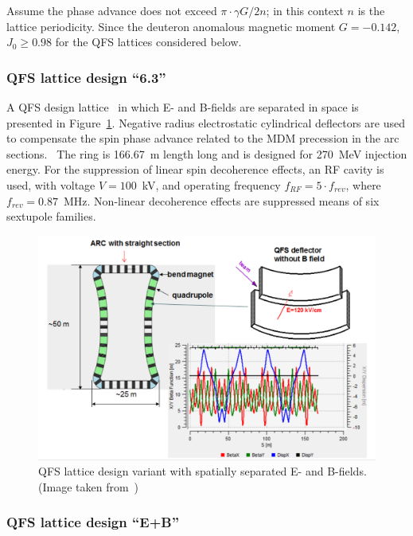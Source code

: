 Assume the phase advance does not exceed $\pi\cdot \gamma G/2n$; in this context $n$ is 
the lattice periodicity. Since the deuteron anomalous magnetic moment $G = -0.142$, $J_0\ge 0.98$ for the QFS lattices considered below.

\subsubsection{QFS lattice design ``6.3''}\label{chpt2:lattice:QFS:6_3}

A QFS design lattice~\cite{Senichev:Lattices} in which E- and B-fields are separated in space
is presented in Figure~\ref{fig:QFS_6_3_lattice}. Negative radius electrostatic cylindrical deflectors 
are used to compensate the spin phase advance related to the MDM precession in the
 arc sections.~\cite{Senichev:QFS_IPAC15}
The ring is 166.67~m length long and is designed for 270~MeV injection energy. For the suppression
of linear spin decoherence effects, an RF cavity is used, with voltage $V = 100$~kV, and operating
frequency $f_{RF} = 5\cdot f_{rev}$, where $f_{rev} = 0.87$~MHz. Non-linear decoherence effects are suppressed
means of six sextupole families.

\begin{figure}[h!]
	\centering
	\includegraphics[width=\linewidth]{images/chapter2/6_3_lattice}
	\caption{QFS lattice design variant with spatially separated E- and B-fields.
          (Image taken from~\cite{Senichev:Lattices})\label{fig:QFS_6_3_lattice}}
\end{figure}

\subsubsection{QFS lattice design ``E+B''}\label{chpt2:lattice:QFS:EB}

